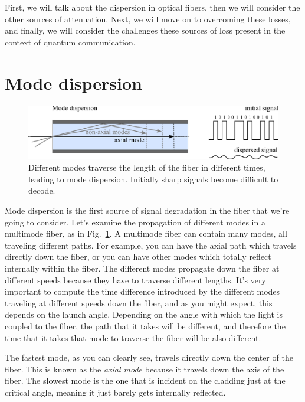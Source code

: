 First, we will talk about the dispersion in optical fibers, then we will consider the other sources of attenuation. Next, we will move on to overcoming these losses, and finally, we will consider the challenges these sources of loss present in the context of quantum communication.


\section{Mode dispersion}
\label{sec:11-2_mode_dispersion}

\begin{figure}
    \centering
    \includegraphics[width=\textwidth]{lesson11/11-2_dispersion.pdf}
    \caption[Mode dispersion]{Different modes traverse the length of the fiber in different times, leading to mode dispersion. Initially sharp signals become difficult to decode.}
    \label{fig:11-2_mode_dispersion}
\end{figure}
Mode dispersion is the first source of signal degradation in the fiber that we're going to consider.
Let's examine the propagation of different modes in a multimode fiber, as in Fig.~\ref{fig:11-2_mode_dispersion}.
A multimode fiber can contain many modes, all traveling different paths. For example, you can have the axial path which travels directly down the fiber, or you can have other modes which totally reflect internally within the fiber. The different modes propagate down the fiber at different speeds because they have to traverse different lengths. It's very important to compute the time difference introduced by the different modes traveling at different speeds down the fiber, and as you might expect, this depends on the launch angle. Depending on the angle with which the light is coupled to the fiber, the path that it takes will be different, and therefore the time that it takes that mode to traverse the fiber will be also different.

The fastest mode, as you can clearly see, travels directly down the center of the fiber. This is known as the \emph{axial mode} because it travels down the axis of the fiber. The slowest mode is the one that is incident on the cladding just at the critical angle, meaning it just barely gets internally reflected.

